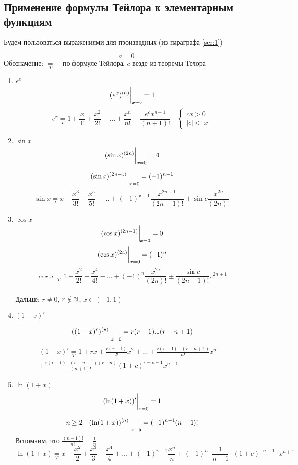 \subsection{Применение формулы Тейлора к элементарным функциям}

Будем пользоваться выражениями для производных (из параграфа \ref{sec:1})

$$ a = 0 $$
Обозначение: $\underset{T}=$ -- по формуле Тейлора. $c$ везде из теоремы Телора
\begin{statements}
    \hfill
    \begin{enumerate}
        \item $e^x$
        $$ (e^x)^{(n)}\bigg|_{x=0}^{} = 1 $$
        $$ e^x \underset{T}= 1 + \frac{x}{1!} + \frac{x^2}{2!} + ... + \frac{x^n}{n!} + \frac{e^cx^{n+1}}{(n+1)!} \quad \begin{cases} cx > 0 \\ |c| < |x| \end{cases} $$
        \item $\sin x$
        $$ (\sin x)^{(2n)}\bigg|_{x=0}^{} = 0 $$
        $$ (\sin x)^{(2n-1)}\bigg|_{x=0}^{} = (-1)^{n-1} $$
        $$ \sin x \underset{T}= x - \frac{x^3}{3!} + \frac{x^5}{5!} - ... + (-1)^{n-1} \frac{x^{2n-1}}{(2n-1)!} \pm \sin c \frac{x^{2n}}{(2n)!} $$
        \item $ \cos x $
        $$ (\cos x)^{(2n-1)}\bigg|_{x=0}^{} = 0 $$
        $$ (\cos x)^{(2n)}\bigg|_{x=0}^{} = (-1)^n $$
        $$ \cos x \underset{T}= 1 - \frac{x^2}{2!} + \frac{x^4}{4!} - ... + (-1)^n \frac{x^{2n}}{(2n)!} \pm \frac{\sin c}{(2n+1)!} x^{2n+1} $$ \\
        Дальше: $r \ne 0$, $r \notin \mathbb{N}$, $x \in (-1,1)$
        \item $(1+x)^r$
        $$ ((1+x)^r)^{(n)}\bigg|_{x=0}^{} = r(r-1)...(r-n+1) $$
        \begin{multline*}
            (1+x)^r \underset{T}= 1 + rx + \frac{r(r-1)}{2!}x^2 + ... + \frac{r(r-1)...(r-n+1)}{n!}x^n + \\ + \frac{r(r-1)...(r-n+1)(r-n)}{(n+1)!}(1+c)^{r-n-1}x^{n+1}
        \end{multline*}
        \item $\ln (1+x)$
        $$ (\ln (1+x))'\bigg|_{x=0}^{} = 1 $$
        $$ n \ge 2 \quad (\ln (1+x))^{(n)}\bigg|_{x=0}^{} = (-1)^{n-1}(n-1)! $$
        Вспомним, что $\frac{(n-1)!}{n!} = \frac1n $
        $$ \ln (1+x) \underset{T}= x - \frac{x^2}2 + \frac{x^3}3 - \frac{x^4}4 + ... + (-1)^{n-1}\frac{x^n}n + (-1)^n \cdot \frac1{n+1} \cdot (1+c)^{-n-1} \cdot x^{n+1} $$
    \end{enumerate}
\end{statements}

